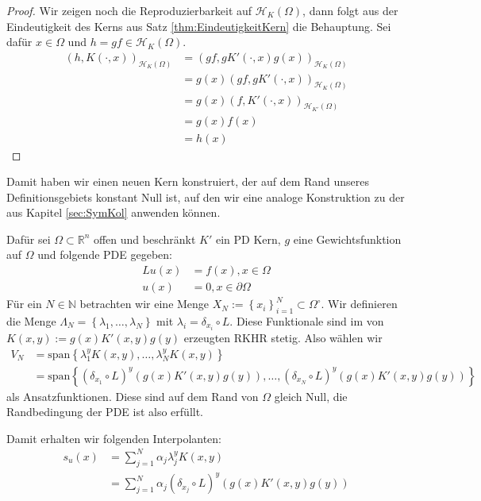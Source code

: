 \begin{proof}
Wir zeigen noch die Reproduzierbarkeit auf $\mathcal{H}_K(\Omega)$, dann folgt aus der Eindeutigkeit des Kerns aus Satz \ref{thm:EindeutigkeitKern} die Behauptung. Sei dafür $x \in \Omega$ und $h = gf \in \mathcal{H}_K (\Omega)$.
\begin{align*}
\left(h, K(\cdot,x) \right)_{\mathcal{H}_K(\Omega)} &= \left(gf, gK'(\cdot, x) g(x)\right)_{\mathcal{H}_K(\Omega)}\\
&= g(x) \left( gf, gK'(\cdot, x)\right)_{\mathcal{H}_K(\Omega)}\\
&= g(x) \left( f, K'(\cdot, x)\right)_{\mathcal{H}_{K'}(\Omega)}\\
&= g(x) f(x)\\
&= h(x)
\end{align*}
\end{proof}

Damit haben wir einen neuen Kern konstruiert, der auf dem Rand unseres Definitionsgebiets konstant Null ist, auf den wir eine analoge Konstruktion zu der aus Kapitel \ref{sec:SymKol} anwenden können.

Dafür sei $\Omega \subset \mathbb{R}^n$ offen und beschränkt $K'$ ein \ac{PD} Kern, $g$ eine Gewichtsfunktion auf $\Omega$ und folgende \ac{PDE} gegeben:
\begin{align*}
Lu(x) &= f(x), x \in \Omega\\
u(x) &= 0 , x \in \partial \Omega
\end{align*}
Für ein $N \in \mathbb{N}$ betrachten wir eine Menge $X_N := \left\{ x_i \right\}_{i=1}^N \subset \Omega^\circ$. Wir definieren die Menge $\Lambda_N = \left\{ \lambda_1, \dots, \lambda_N\right\}$ mit $\lambda_i =  \delta_{x_i} \circ L$. Diese Funktionale sind im von $K(x,y) := g(x) K'(x,y) g(y)$ erzeugten \ac{RKHR} stetig. Also wählen wir 
\begin{align*}
V_N &= \text{span} \left\{\lambda_1^y K(x,y), \dots, \lambda_N^y K(x,y)\right\}\\
&= \text{span} \left\{(\delta_{x_1} \circ L)^y (g(x) K'(x,y) g(y)), \dots, (\delta_{x_N} \circ L)^y (g(x) K'(x,y) g(y))\right\}
\end{align*}
als Ansatzfunktionen. Diese sind auf dem Rand von $\Omega$ gleich Null, die Randbedingung der \gls{PDE} ist also erfüllt.

Damit erhalten wir folgenden Interpolanten:
\begin{align*}
s_u(x) &= \sum_{j=1}^N \alpha_j \lambda_j^y K(x,y)\\
&= \sum_{j=1}^N \alpha_j (\delta_{x_j} \circ L)^y( g(x)K'(x,y)g(y))
\end{align*}

